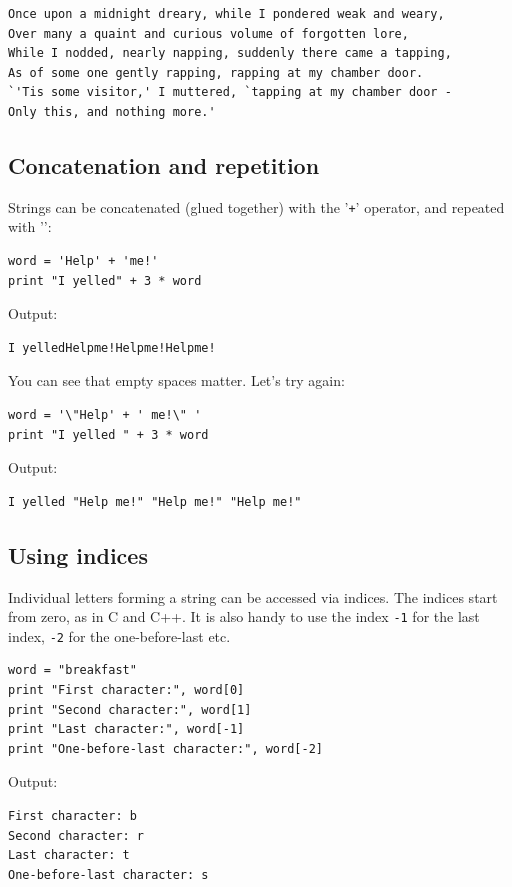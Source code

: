 \begin{verbatim}
Once upon a midnight dreary, while I pondered weak and weary,
Over many a quaint and curious volume of forgotten lore,
While I nodded, nearly napping, suddenly there came a tapping,
As of some one gently rapping, rapping at my chamber door.
`'Tis some visitor,' I muttered, `tapping at my chamber door -
Only this, and nothing more.'
\end{verbatim}

\subsection{Concatenation and repetition}

Strings can be concatenated (glued together) with the '{\tt +}' operator, and repeated with '{\tt *}':

\begin{verbatim}
word = 'Help' + 'me!'
print "I yelled" + 3 * word
\end{verbatim}
Output:

\begin{verbatim}
I yelledHelpme!Helpme!Helpme!
\end{verbatim}
You can see that empty spaces matter. Let's try again:

\begin{verbatim}
word = '\"Help' + ' me!\" '
print "I yelled " + 3 * word
\end{verbatim}
Output:

\begin{verbatim}
I yelled "Help me!" "Help me!" "Help me!"
\end{verbatim}

\subsection{Using indices}

Individual letters forming a string can be accessed via indices. The indices 
start from zero, as in C and C++. It is also handy to use the index {\tt -1} 
for the last index, {\tt -2} for the one-before-last etc.

\begin{verbatim}
word = "breakfast"
print "First character:", word[0]
print "Second character:", word[1]
print "Last character:", word[-1]
print "One-before-last character:", word[-2]
\end{verbatim}
Output:

\begin{verbatim}
First character: b
Second character: r
Last character: t
One-before-last character: s
\end{verbatim}

